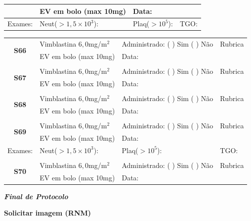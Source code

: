 \documentclass[11pt,a4paper,oldfontcommands]{memoir}
\begin{document}
\begin{center}
\begin{table}[H]
\begin{tabular}{p{}p{}|p{}|p{3cm}}
    \multicolumn{1}{c|}{}&{EV em bolo (max 10mg)}&{Data:}&\\
    \hline
    {Exames:}&{Neut(\(>1,5\times10^3\)):}&{Plaq(\(>10^5\)):}&{TGO:}
    \\
    \hline
\end{tabular}
\end{table}
\begin{table}[H]
\begin{tabular}{p{}p{}|p{}|p{3cm}}
    \hline
    \multicolumn{1}{c|}{\multirow{2}{*}{\textbf{S66}}}&{Vimblastina \(6,0\)mg/m\(^2\)}&{Administrado: (  ) Sim (  ) Não}&{Rubrica}\\
    \multicolumn{1}{c|}{}&{EV em bolo (max 10mg)}&{Data:}&\\
    \hline\\
    \hline
    \multicolumn{1}{c|}{\multirow{2}{*}{\textbf{S67}}}&{Vimblastina \(6,0\)mg/m\(^2\)}&{Administrado: (  ) Sim (  ) Não}&{Rubrica}\\
    \multicolumn{1}{c|}{}&{EV em bolo (max 10mg)}&{Data:}&\\
    \hline\\
    \hline
    \multicolumn{1}{c|}{\multirow{2}{*}{\textbf{S68}}}&{Vimblastina \(6,0\)mg/m\(^2\)}&{Administrado: (  ) Sim (  ) Não}&{Rubrica}\\
    \multicolumn{1}{c|}{}&{EV em bolo (max 10mg)}&{Data:}&\\
    \hline
    \\
     \hline
    \multicolumn{1}{c|}{\multirow{2}{*}{\textbf{S69}}}&{Vimblastina \(6,0\)mg/m\(^2\)}&{Administrado: (  ) Sim (  ) Não}&{Rubrica}\\
    \multicolumn{1}{c|}{}&{EV em bolo (max 10mg)}&{Data:}&\\
    \hline
    {Exames:}&{Neut(\(>1,5\times10^3\)):}&{Plaq(\(>10^5\)):}&{TGO:}
    \\
    \hline\\
    \hline
    \multicolumn{1}{c|}{\multirow{2}{*}{\textbf{S70}}}&{Vimblastina \(6,0\)mg/m\(^2\)}&{Administrado: (  ) Sim (  ) Não}&{Rubrica}\\
    \multicolumn{1}{c|}{}&{EV em bolo (max 10mg)}&{Data:}&\\
    \hline
\end{tabular}
\end{table}
\textbf{\textit{Final de Protocolo}}

\textbf{Solicitar imagem (RNM)}
\end{center}

\cleardoublepage
\end{document}
